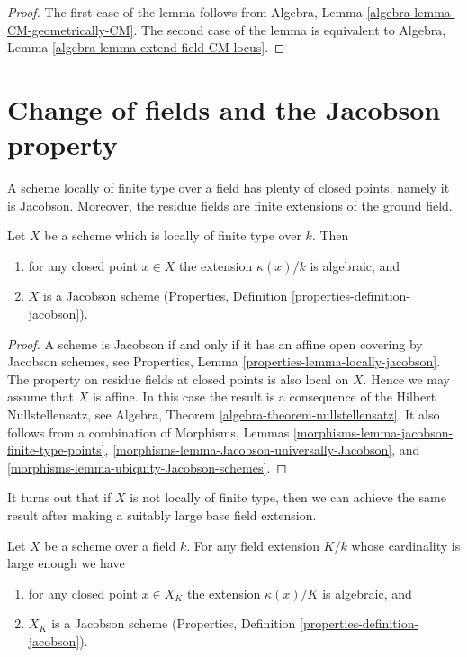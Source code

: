 \begin{proof}
The first case of the lemma follows from
Algebra, Lemma \ref{algebra-lemma-CM-geometrically-CM}.
The second case of the lemma is equivalent to
Algebra, Lemma \ref{algebra-lemma-extend-field-CM-locus}.
\end{proof}







\section{Change of fields and the Jacobson property}
\label{section-overfield}

\noindent
A scheme locally of finite type over a field has plenty of closed
points, namely it is Jacobson. Moreover, the residue fields are
finite extensions of the ground field.

\begin{lemma}
\label{lemma-locally-finite-type-Jacobson}
Let $X$ be a scheme which is locally of finite type over $k$.
Then
\begin{enumerate}
\item for any closed point $x \in X$ the extension $\kappa(x)/k$
is algebraic, and
\item $X$ is a Jacobson scheme
(Properties, Definition \ref{properties-definition-jacobson}).
\end{enumerate}
\end{lemma}

\begin{proof}
A scheme is Jacobson if and only if it has an affine open covering
by Jacobson schemes, see
Properties, Lemma \ref{properties-lemma-locally-jacobson}.
The property on residue fields at closed points is also local on $X$.
Hence we may assume that $X$ is affine. In this case the result
is a consequence of the Hilbert Nullstellensatz, see
Algebra, Theorem \ref{algebra-theorem-nullstellensatz}.
It also follows from a combination of
Morphisms, Lemmas \ref{morphisms-lemma-jacobson-finite-type-points},
\ref{morphisms-lemma-Jacobson-universally-Jacobson}, and
\ref{morphisms-lemma-ubiquity-Jacobson-schemes}.
\end{proof}

\noindent
It turns out that if $X$ is not locally of finite type, then we can
achieve the same result after making a suitably large base field extension.

\begin{lemma}
\label{lemma-make-Jacobson}
Let $X$ be a scheme over a field $k$.
For any field extension $K/k$ whose cardinality is large enough
we have
\begin{enumerate}
\item for any closed point $x \in X_K$ the extension $\kappa(x)/K$
is algebraic, and
\item $X_K$ is a Jacobson scheme
(Properties, Definition \ref{properties-definition-jacobson}).
\end{enumerate}
\end{lemma}

